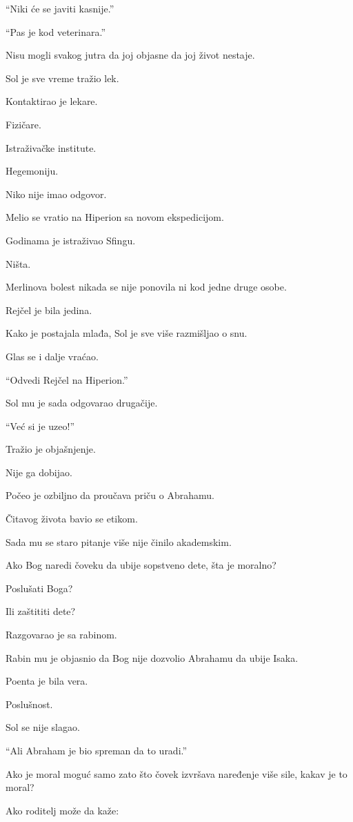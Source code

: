 ``Niki će se javiti kasnije.''

``Pas je kod veterinara.''

Nisu mogli svakog jutra da joj objasne da joj život nestaje.

Sol je sve vreme tražio lek.

Kontaktirao je lekare.

Fizičare.

Istraživačke institute.

Hegemoniju.

Niko nije imao odgovor.

Melio se vratio na Hiperion sa novom ekspedicijom.

Godinama je istraživao Sfingu.

Ništa.

Merlinova bolest nikada se nije ponovila ni kod jedne druge osobe.

Rejčel je bila jedina.

\bigskip

Kako je postajala mlađa, Sol je sve više razmišljao o snu.

Glas se i dalje vraćao.

``Odvedi Rejčel na Hiperion.''

Sol mu je sada odgovarao drugačije.

``Već si je uzeo!''

Tražio je objašnjenje.

Nije ga dobijao.

Počeo je ozbiljno da proučava priču o Abrahamu.

Čitavog života bavio se etikom.

Sada mu se staro pitanje više nije činilo akademskim.

Ako Bog naredi čoveku da ubije sopstveno dete, šta je moralno?

Poslušati Boga?

Ili zaštititi dete?

Razgovarao je sa rabinom.

Rabin mu je objasnio da Bog nije dozvolio Abrahamu da ubije Isaka.

Poenta je bila vera.

Poslušnost.

Sol se nije slagao.

``Ali Abraham je bio spreman da to uradi.''

Ako je moral moguć samo zato što čovek izvršava naređenje više sile, kakav je to moral?

Ako roditelj može da kaže:

